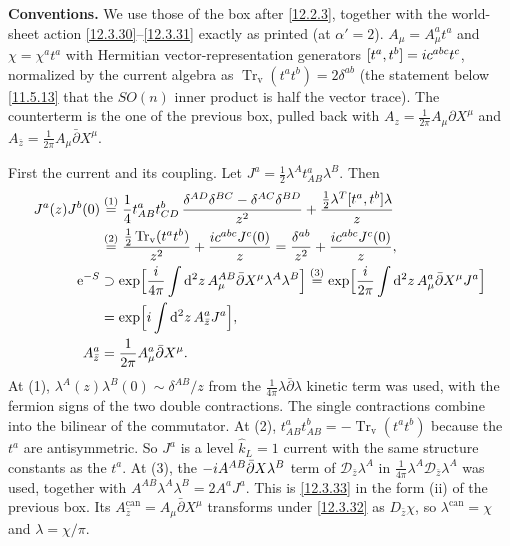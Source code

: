 \begin{tcolorbox}[breakable]
	\begin{remark}
		\textbf{Conventions.} We use those of the box after \eqref{12.2.3}, together with the world-sheet action \eqref{12.3.30}--\eqref{12.3.31} exactly as printed (at $\alpha'=2$). $A_{\mu}=A^{a}_{\mu}t^{a}$ and $\chi=\chi^{a}t^{a}$ with Hermitian vector-representation generators $[t^{a},t^{b}]=i c^{abc}t^{c}$, normalized by the current algebra as $\operatorname{Tr}_{\mathrm v}(t^{a}t^{b})=2\delta^{ab}$ (the statement below \eqref{11.5.13} that the $SO(n)$ inner product is half the vector trace). The counterterm is the one of the previous box, pulled back with $A_{z}=\frac{1}{2\pi}A_{\mu}\partial X^{\mu}$ and $A_{\bar z}=\frac{1}{2\pi}A_{\mu}\bar\partial X^{\mu}$.

		First the current and its coupling. Let $J^{a}=\frac12\lambda^{A}t^{a}_{AB}\lambda^{B}$. Then
		\begin{align*}
			J^{a}(z)J^{b}(0)&\overset{(1)}{=} \frac14t^{a}_{AB}t^{b}_{CD}\,\frac{\delta^{AD}\delta^{BC}-\delta^{AC}\delta^{BD}}{z^{2}}+\frac{\frac12\lambda^{T}[t^{a},t^{b}]\lambda}{z}\\
			&\overset{(2)}{=} \frac{\frac12\operatorname{Tr}_{\mathrm v}(t^{a}t^{b})}{z^{2}}+\frac{i c^{abc}J^{c}(0)}{z}=\frac{\delta^{ab}}{z^{2}}+\frac{i c^{abc}J^{c}(0)}{z},\\
			\mathrm{e}^{-S}&\supset\exp\Bigl[\frac{i}{4\pi}\int\mathrm{d}^{2}z\,A^{AB}_{\mu}\bar\partial X^{\mu}\lambda^{A}\lambda^{B}\Bigr]
			\overset{(3)}{=} \exp\Bigl[\frac{i}{2\pi}\int\mathrm{d}^{2}z\,A^{a}_{\mu}\bar\partial X^{\mu}J^{a}\Bigr]\\
			&=\exp\Bigl[i\int\mathrm{d}^{2}z\,A^{a}_{\bar z}J^{a}\Bigr],\\
			A^{a}_{\bar z}&=\frac{1}{2\pi}A^{a}_{\mu}\bar\partial X^{\mu} .
		\end{align*}
		At (1), $\lambda^{A}(z)\lambda^{B}(0)\sim\delta^{AB}/z$ from the $\frac{1}{4\pi}\lambda\bar\partial\lambda$ kinetic term was used, with the fermion signs of the two double contractions. The single contractions combine into the bilinear of the commutator. At (2), $t^{a}_{AB}t^{b}_{AB}=-\operatorname{Tr}_{\mathrm v}(t^{a}t^{b})$ because the $t^{a}$ are antisymmetric. So $J^{a}$ is a level $\hat k_{L}=1$ current with the same structure constants as the $t^{a}$. At (3), the $-i A^{AB}\bar\partial X\lambda^{B}$ term of $\mathscr D_{\bar z}\lambda^{A}$ in $\frac{1}{4\pi}\lambda^{A}\mathscr D_{\bar z}\lambda^{A}$ was used, together with $A^{AB}\lambda^{A}\lambda^{B}=2A^{a}J^{a}$. This is \eqref{12.3.33} in the form (ii) of the previous box. Its $A^{\text{can}}_{\bar z}=A_{\mu}\bar\partial X^{\mu}$ transforms under \eqref{12.3.32} as $D_{\bar z}\chi$, so $\lambda^{\text{can}}=\chi$ and $\lambda=\chi/\pi$.


\end{remark}
\end{tcolorbox}
